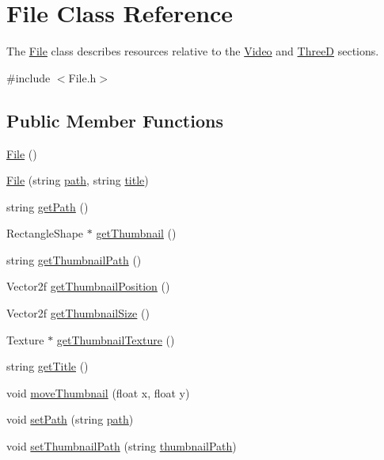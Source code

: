 \hypertarget{classFile}{}\section{File Class Reference}
\label{classFile}


The \hyperlink{classFile}{File} class describes resources relative to the \hyperlink{classVideo}{Video} and \hyperlink{classThreeD}{ThreeD} sections.  




{\ttfamily \#include $<$File.\+h$>$}

\subsection*{Public Member Functions}
\begin{DoxyCompactItemize}
\item 
\hyperlink{classFile_ae039af5807fc385f41b60644725d15d0}{File} ()
\item 
\hyperlink{classFile_a1ede4d44b5010bf25d3550af017b3f38}{File} (string \hyperlink{classFile_afd963fd6ba55fa762f7d3ab962e97e6c}{path}, string \hyperlink{classFile_a302a98ac2a5820e288e9be26d5947bc4}{title})
\item 
string \hyperlink{classFile_afba45549e5ffb4741dc1da7e242f16d8}{get\+Path} ()
\item 
Rectangle\+Shape $\ast$ \hyperlink{classFile_a29e127bbe05e9d28b803502ed7284339}{get\+Thumbnail} ()
\item 
string \hyperlink{classFile_a3ef33194903dba59d7ca995cbcee97f1}{get\+Thumbnail\+Path} ()
\item 
Vector2f \hyperlink{classFile_a6291b69f260763ee5b7b866759d84f86}{get\+Thumbnail\+Position} ()
\item 
Vector2f \hyperlink{classFile_a391872e43babdf3f7102e344580f6bee}{get\+Thumbnail\+Size} ()
\item 
Texture $\ast$ \hyperlink{classFile_a9f2b0c81139a45a0f07b7c5b148abb52}{get\+Thumbnail\+Texture} ()
\item 
string \hyperlink{classFile_aa219f76e1e20c28778e5b788e999a392}{get\+Title} ()
\item 
void \hyperlink{classFile_a1eb39ed6c41a050736dabca651e5ab68}{move\+Thumbnail} (float x, float y)
\item 
void \hyperlink{classFile_a09e268eb95f034e6e92ea036683ebe79}{set\+Path} (string \hyperlink{classFile_afd963fd6ba55fa762f7d3ab962e97e6c}{path})
\item 
void \hyperlink{classFile_a82fc9a4cf769c39891e1016e81820950}{set\+Thumbnail\+Path} (string \hyperlink{classFile_a66dfca1082630f791541c8feefbc729d}{thumbnail\+Path})

\end{DoxyCompactItemize}
